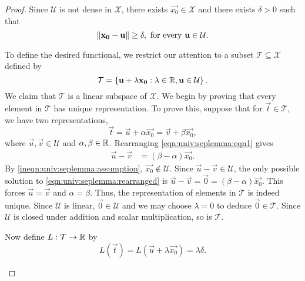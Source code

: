 \begin{proof}
Since $\mathcal{U}$ is not dense in $\mathcal{X}$, there exists $\vec{x_0} \in \mathcal{X}$ and there exists $\delta > 0$ such that \begin{equation}
    \label{ineqn:univ:seplemma:assumption}
    \left\lVert\mathbf{x_0} - \mathbf{u}\right\rVert \geq \delta, \text{ for every } \mathbf{u} \in \mathcal{U}.
\end{equation}
\setcounter{step}{0}
\begin{step}
To define the desired functional, we restrict our attention to a subset $\mathcal{T} \subseteq \mathcal{X}$
defined by \begin{equation*}
    \mathcal{T} = \left \{ \mathbf{u} + \lambda \mathbf{x_0} : \lambda \in {\mathbb R}, \mathbf{u} \in \mathcal{U} \right \}.
\end{equation*}
We claim that $\mathcal{T}$ is a linear subspace of $\mathcal{X}$. We begin by proving that every element in $\mathcal{T}$ has unique representation. To prove this, suppose that for $\vec{t} \in \mathcal{T}$, we have two representations, \begin{equation}
    \label{eqn:univ:seplemma:eqn1}
    \vec{t} = \vec{u} + \alpha \vec{x_0} = \vec{v} + \beta \vec{x_0}, 
\end{equation}
where $\vec{u}, \vec{v} \in \mathcal{U}$ and $\alpha, \beta \in {\mathbb R}$. Rearranging \ref{eqn:univ:seplemma:eqn1} gives \begin{align}
    \label{eqn:univ:seplemma:rearranged}
    \vec{u} - \vec{v} &= (\beta - \alpha) \vec{x_0}.
\end{align}
By \ref{ineqn:univ:seplemma:assumption}, $\vec{x_0} \not \in \mathcal{U}$. Since $\vec{u} - \vec{v} \in \mathcal{U}$, the only possible solution to \ref{eqn:univ:seplemma:rearranged} is $\vec{u} - \vec{v} = \vec{0} = (\beta - \alpha) \vec{x_0}$. This forces $\vec{u} = \vec{v}$ and $\alpha = \beta$. Thus, the representation of elements in $\mathcal{T}$ is indeed unique. Since $\mathcal{U}$ is linear, $\vec{0} \in \mathcal{U}$ and we may choose $\lambda = 0$ to deduce $\vec{0} \in \mathcal{T}$. Since $\mathcal{U}$ is closed under addition and scalar multiplication, so is $\mathcal{T}$.
\end{step} 
\begin{step}
Now define $L : \mathcal{T} \to {\mathbb R}$ by \begin{equation*}
    L (\vec{t}) = L (\vec{u} + \lambda \vec{x_0}) = \lambda \delta.
\end{equation*}

\end{step}
\end{proof}
